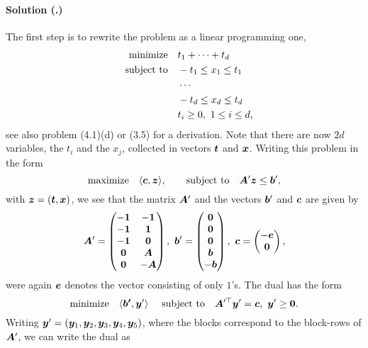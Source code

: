 \documentclass{article}
\newcounter{problemSheetNumber}
\newcounter{problems}
\renewcommand{\solution}[1]{\paragraph{Solution (\theproblemSheetNumber.\theproblems)}\addtocounter{problems}{1}\label{#1}}
\begin{document}
\solution{pr3} The first step is to rewrite the problem as a linear programming one,
\begin{align*}
\text{minimize}\quad & t_1+\cdots +t_d\\
\quad\text{subject to}\quad & -t_1\leq x_1\leq t_1\\
& \cdots\\
& -t_d\leq x_d\leq t_d\\
& t_i\geq 0, \ 1\leq i\leq d,
\end{align*}
see also problem (4.1)(d) or (3.5) for a derivation. Note that there are now $2d$ variables, the $t_i$ and the $x_j$, collected in vectors $\bm{t}$ and $\bm{x}$. Writing this problem in the form
\begin{equation*}
 \text{maximize}\quad \langle {\bm{c}}, {\bm{z}} \rangle, \quad \quad\text{subject to}\quad \bm{A}'\bm{z}\leq \bm{b}',
\end{equation*}
with $\bm{z}=(\bm{t},\bm{x})$, we see that the matrix $\bm{A}'$ and the vectors $\bm{b}'$ and $\bm{c}$ are given by
\begin{equation*}
 \mtx{A}' = \begin{pmatrix} 
            -\mtx{1} & -\mtx{1}\\
            -\mtx{1} & \mtx{1}\\
            -\mtx{1} & \zerovct\\
            \zerovct & \mtx{A}\\
            \zerovct & -\mtx{A}
           \end{pmatrix}, \ 
 \vct{b}' = \begin{pmatrix}
             \zerovct\\ \zerovct \\ \zerovct \\ \vct{b} \\ -\vct{b}
            \end{pmatrix}, \
 \vct{c} = \begin{pmatrix}
            -\vct{e}\\ \zerovct
           \end{pmatrix},
\end{equation*}
were again $\bm{e}$ denotes the vector consisting of only $1$'s.
The dual has the form
\begin{equation*}
 \minimize \ip{\vct{b'}}{\vct{y}'} \ \subjto \mtx{A}'^{\trans}\vct{y}' =\vct{c}, \ \vct{y}'\geq \zerovct.
\end{equation*}
Writing $\bm{y}'=(\bm{y}_1,\bm{y}_2,\bm{y}_3,\bm{y}_4,\bm{y}_5)$, where the blocks correspond to the block-rows of $\bm{A}'$, we can write the dual as
\end{document}
